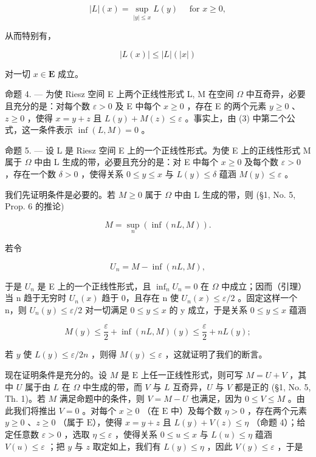 \[
| L | (x) = \sup _ {| y | \leqslant x} L (y) \quad \text { for } x \geqslant 0,\tag{4}
\]

从而特别有，

\[
| L (x) | \leqslant | L | (| x |)\tag{5}
\]

对一切 \(x \in \mathbf{E}\) 成立。

命题 4. --- 为使 Riesz 空间 E 上两个正线性形式 L, M 在空间 \(\Omega\) 中互奇异，必要且充分的是：对每个数 \(\varepsilon > 0\) 及 E 中每个 \(x \geqslant 0\) ，存在 E 的两个元素 \(y \geqslant 0\) 、\(z \geqslant 0\) ，使得 \(x = y + z\) 且 \(L(y) + M(z) \leqslant \varepsilon\) 。事实上，由 (3) 中第二个公式，这一条件表示 \(\inf(L, M) = 0\) 。

命题 5. --- 设 L 是 Riesz 空间 E 上的一个正线性形式。为使 E 上的正线性形式 M 属于 \(\Omega\) 中由 L 生成的带，必要且充分的是：对 E 中每个 \(x \geqslant 0\) 及每个数 \(\varepsilon > 0\) ，存在一个数 \(\delta > 0\) ，使得关系 \(0 \leqslant y \leqslant x\) 与 \(L(y) \leqslant \delta\) 蕴涵 \(M(y) \leqslant \varepsilon\) 。

我们先证明条件是必要的。若 \(M \geqslant 0\) 属于 \(\Omega\) 中由 L 生成的带，则 (§1, No. 5, Prop. 6 的推论)

\[
M = \sup _ {n} \left(\inf (n L, M)\right).
\]

若令

\[
U _ {n} = M - \inf (n L, M),
\]

于是 \(U_{n}\) 是 E 上的一个正线性形式，且 \(\inf_{n} U_{n} = 0\) 在 \(\Omega\) 中成立；因而（引理）当 n 趋于无穷时 \(U_{n}(x)\) 趋于 0，且存在 n 使 \(U_{n}(x) \leqslant \varepsilon / 2\) 。固定这样一个 n，则 \(U_{n}(y) \leqslant \varepsilon / 2\) 对一切满足 \(0 \leqslant y \leqslant x\) 的 y 成立，于是关系 \(0 \leqslant y \leqslant x\) 蕴涵

\[
M (y) \leqslant \frac {\varepsilon}{2} + \inf (n L, M) (y) \leqslant \frac {\varepsilon}{2} + n L (y);
\]

若 \(y\) 使 \(L(y) \leqslant \varepsilon / 2n\) ，则得 \(M(y) \leqslant \varepsilon\) ，这就证明了我们的断言。

现在证明条件是充分的。设 \(M\) 是 \(\mathrm{E}\) 上任一正线性形式，则可写 \(M = U + V\) ，其中 \(U\) 属于由 \(L\) 在 \(\Omega\) 中生成的带，而 \(V\) 与 \(L\) 互奇异，\(U\) 与 \(V\) 都是正的 (§1, No. 5, Th. 1)。若 \(M\) 满足命题中的条件，则 \(V = M - U\) 也满足，因为 \(0 \leqslant V \leqslant M\) 。由此我们将推出 \(V = 0\) 。对每个 \(x \geqslant 0\) （在 \(\mathrm{E}\) 中）及每个数 \(\eta > 0\) ，存在两个元素 \(y \geqslant 0\) 、\(z \geqslant 0\) （属于 \(\mathrm{E}\)），使得 \(x = y + z\) 且 \(L(y) + V(z) \leqslant \eta\) （命题 4）；给定任意数 \(\varepsilon > 0\) ，选取 \(\eta \leqslant \varepsilon\) ，使得关系 \(0 \leqslant u \leqslant x\) 与 \(L(u) \leqslant \eta\) 蕴涵 \(V(u) \leqslant \varepsilon\) ；把 \(y\) 与 \(z\) 取定如上，我们有 \(L(y) \leqslant \eta\) ，因此 \(V(y) \leqslant \varepsilon\) ，于是

